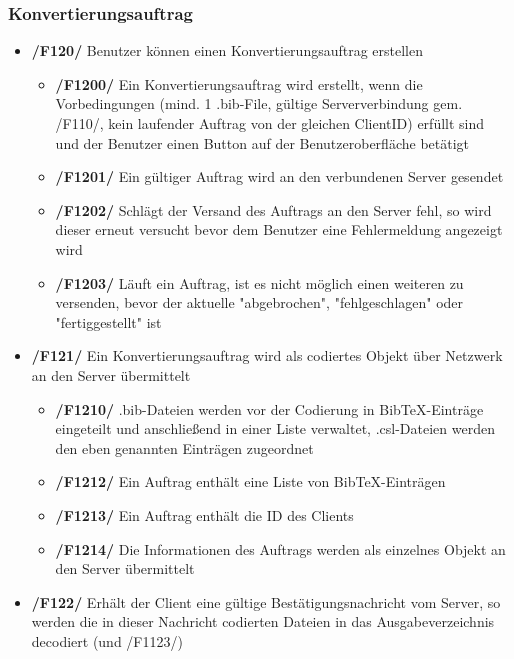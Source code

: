 \documentclass[11pt]{article} %
\begin{document}
\subsubsection{Konvertierungsauftrag}

\begin{itemize}
\item{\textbf{/F120/} Benutzer können einen Konvertierungsauftrag erstellen}

\begin{itemize}
\item{\textbf{/F1200/} Ein Konvertierungsauftrag wird erstellt, wenn die Vorbedingungen (mind. 1 .bib-File, gültige Serververbindung gem. /F110/, kein laufender Auftrag von der gleichen ClientID) erfüllt sind und der Benutzer einen Button auf der Benutzeroberfläche betätigt}
\item{\textbf{/F1201/} Ein gültiger Auftrag wird an den verbundenen Server gesendet}
\item{\textbf{/F1202/} Schlägt der Versand des Auftrags an den Server fehl, so wird dieser erneut versucht bevor dem Benutzer eine Fehlermeldung angezeigt wird}
\item{\textbf{/F1203/} Läuft ein Auftrag, ist es nicht möglich einen weiteren zu versenden, bevor der aktuelle "abgebrochen", "fehlgeschlagen" oder "fertiggestellt" ist}
\end{itemize}

\item{\textbf{/F121/} Ein Konvertierungsauftrag wird als codiertes Objekt über Netzwerk an den Server übermittelt}

\begin{itemize}
\item{\textbf{/F1210/} .bib-Dateien werden vor der Codierung in BibTeX-Einträge eingeteilt und anschließend in einer Liste verwaltet, .csl-Dateien werden den eben genannten Einträgen zugeordnet}
\item{\textbf{/F1212/} Ein Auftrag enthält eine Liste von BibTeX-Einträgen}
\item{\textbf{/F1213/} Ein Auftrag enthält die ID des Clients}
\item{\textbf{/F1214/} Die Informationen des Auftrags werden als einzelnes Objekt an den Server übermittelt}
\end{itemize}

\item{\textbf{/F122/} Erhält der Client eine gültige Bestätigungsnachricht vom Server, so werden die in dieser Nachricht codierten Dateien in das Ausgabeverzeichnis decodiert (und  /F1123/)}

\end{itemize}
\end{document}
